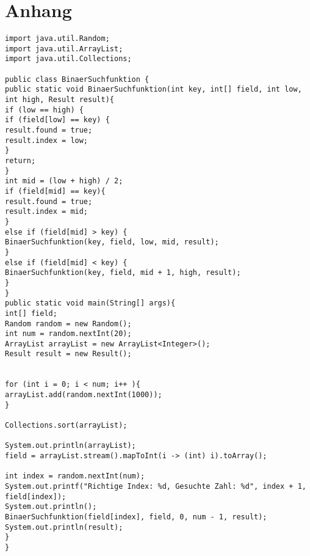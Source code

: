 \documentclass[12pt,a4paper]{article}
\begin{document}
\section{Anhang}
\begin{lstlisting}
import java.util.Random;
import java.util.ArrayList;
import java.util.Collections;

public class BinaerSuchfunktion {
public static void BinaerSuchfunktion(int key, int[] field, int low, int high, Result result){
if (low == high) {
if (field[low] == key) {
result.found = true;
result.index = low;
}
return;
}
int mid = (low + high) / 2;
if (field[mid] == key){
result.found = true;
result.index = mid;
}
else if (field[mid] > key) {
BinaerSuchfunktion(key, field, low, mid, result);
}
else if (field[mid] < key) {
BinaerSuchfunktion(key, field, mid + 1, high, result);
}
}
public static void main(String[] args){
int[] field;
Random random = new Random();
int num = random.nextInt(20);
ArrayList arrayList = new ArrayList<Integer>();
Result result = new Result();


for (int i = 0; i < num; i++ ){
arrayList.add(random.nextInt(1000));
}

Collections.sort(arrayList);

System.out.println(arrayList);
field = arrayList.stream().mapToInt(i -> (int) i).toArray();

int index = random.nextInt(num);
System.out.printf("Richtige Index: %d, Gesuchte Zahl: %d", index + 1, field[index]);
System.out.println();
BinaerSuchfunktion(field[index], field, 0, num - 1, result);
System.out.println(result);
}
}
\end{lstlisting}
\end{document}
